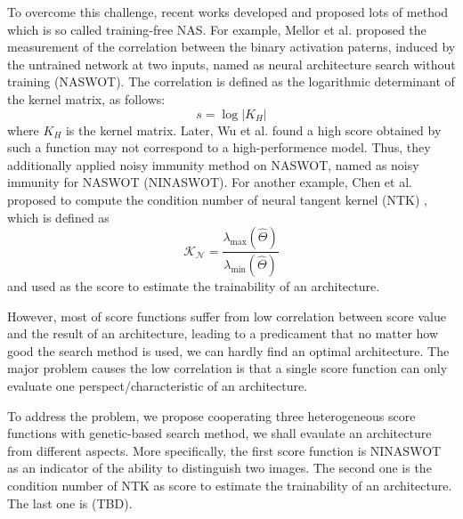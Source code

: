\documentclass[sigconf]{acmart}
\begin{document}
    To overcome this challenge, recent works developed and proposed lots 
    of method which is so called training-free NAS. 
    For example, Mellor et al. \cite{https://doi.org/10.48550/arxiv.2006.04647} proposed the 
    measurement of the correlation between the binary activation paterns, 
    induced by the untrained network at two inputs, named as neural architecture 
    search without training (NASWOT). The correlation is defined as the 
    logarithmic determinant of the kernel matrix, as follows:
    \begin{equation}
        s=\log\lvert K_H\rvert
    \end{equation}
    where $K_H$ is the kernel matrix.
    Later, Wu et al. \cite{10.1145/3491396.3506510} found a high score 
    obtained by such a function may not correspond to a high-performence 
    model. Thus, they additionally applied noisy immunity method on NASWOT, 
    named as noisy immunity for NASWOT (NINASWOT).
    For another example, Chen et al. proposed to compute the condition 
    number of neural tangent kernel (NTK) \cite{https://doi.org/10.48550/arxiv.2102.11535} 
    \cite{https://doi.org/10.48550/arxiv.2203.09137} \cite{https://doi.org/10.48550/arxiv.2109.00817}, 
    which is defined as 
    \begin{equation}
        \mathcal{K_N}=\frac{\lambda_{\textrm{max}}(\hat\Theta)}{\lambda_{\textrm{min}}(\hat\Theta)}
    \end{equation}
    and used as the score to estimate the trainability of an architecture.

    However, most of score functions suffer from low correlation between 
    score value and the result of an architecture, leading to a predicament 
    that no matter how good the search method is used, we can hardly find 
    an optimal architecture. 
    The major problem causes the low correlation is that a single score 
    function can only evaluate one perspect/characteristic of an architecture.
    
    To address the problem, we propose cooperating three heterogeneous score 
    functions with genetic-based search method, we shall evaulate an architecture 
    from different aspects. More specifically, the first score function is 
    NINASWOT \cite{10.1145/3491396.3506510} as an indicator of the ability 
    to distinguish two images. The second one is the condition number of NTK 
    \cite{https://doi.org/10.48550/arxiv.2102.11535} as score to estimate the 
    trainability of an architecture. The last one is (TBD).
\end{document}
